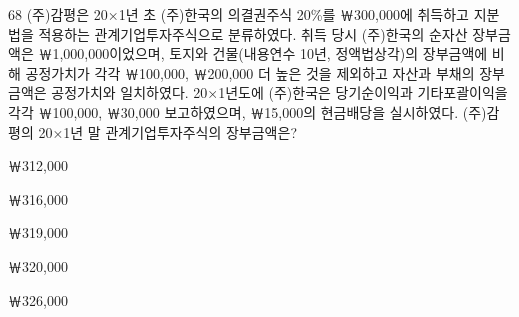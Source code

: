 \begin{question}{68}
(주)감평은 20×1년 초 (주)한국의 의결권주식 20\%를 ￦300,000에 취득하고 지분법을 적용하는 관계기업투자주식으로 분류하였다. 취득 당시 (주)한국의 순자산 장부금액은 ￦1,000,000이었으며, 토지와 건물(내용연수 10년, 정액법상각)의 장부금액에 비해 공정가치가 각각 ￦100,000, ￦200,000 더 높은 것을 제외하고 자산과 부채의 장부금액은 공정가치와 일치하였다. 20×1년도에 (주)한국은 당기순이익과 기타포괄이익을 각각 ￦100,000, ￦30,000 보고하였으며, ￦15,000의 현금배당을 실시하였다. (주)감평의 20×1년 말 관계기업투자주식의 장부금액은?
\begin{choices}
  \item ￦312,000
  \item ￦316,000
  \item ￦319,000
  \item ￦320,000
  \item ￦326,000
\end{choices}
\end{question}
